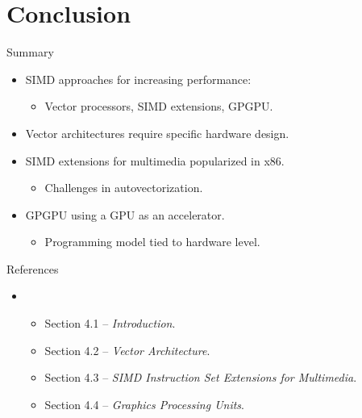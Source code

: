 \section{Conclusion}

\begin{frame}[t]{Summary}
\begin{itemize}
  \item SIMD approaches for increasing performance:
    \begin{itemize}
      \item Vector processors, SIMD extensions, GPGPU.
    \end{itemize}

  \item Vector architectures require specific hardware design.

  \item SIMD extensions for multimedia popularized in x86.
    \begin{itemize}
      \item Challenges in autovectorization.
    \end{itemize}

  \item GPGPU using a GPU as an accelerator.
    \begin{itemize}
      \item Programming model tied to hardware level.
    \end{itemize}
\end{itemize}
\end{frame}

\begin{frame}[t]{References}
\begin{itemize}
  \item \bibhennessy
    \begin{itemize}
      \item Section 4.1 -- \emph{Introduction}.
      \item Section 4.2 -- \emph{Vector Architecture}.
      \item Section 4.3 -- \emph{SIMD Instruction Set Extensions for Multimedia}.
      \item Section 4.4 -- \emph{Graphics Processing Units}.
    \end{itemize}
\end{itemize}
\end{frame}

